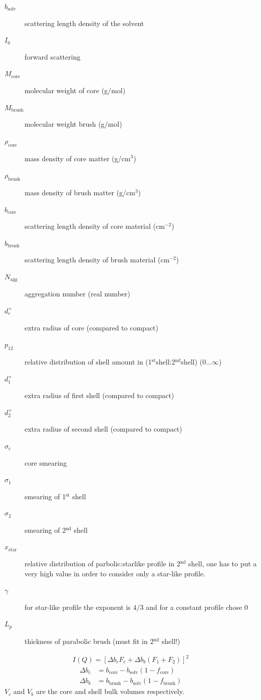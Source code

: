 \begin{description}
\item[$b_\text{solv}$]  scattering length density of the solvent
\item[$I_0$] forward scattering
\item[$M_\text{core}$] molecular weight of core (g/mol)
\item[$M_\text{brush}$] molecular weight brush (g/mol)
\item[$\rho_\text{core}$] mass density of core matter (g/cm$^3$)
\item[$\rho_\text{brush}$] mass density of brush matter (g/cm$^3$)
\item[$b_\text{core}$] scattering length density of core material (cm$^{-2}$)
\item[$b_\text{brush}$] scattering length density of brush material (cm$^{-2}$)
\item[$N_\text{agg}$] aggregation number (real number)
\item[$d_c^+$] extra radius of core (compared to compact)
\item[$p_{12}$] relative distribution of shell amount in
(1$^\text{st}$shell:2$^\text{nd}$shell) ($0\ldots\infty$)
\item[$d_1^+$] extra radius of first shell (compared to compact)
\item[$d_2^+$] extra radius of second shell (compared to compact)
\item[$\sigma_c$] core smearing
\item[$\sigma_1$] smearing of 1$^\text{st}$ shell
\item[$\sigma_2$] smearing of 2$^\text{nd}$ shell
\item[$x_\text{star}$] relative distribution of
parbolic:starlike profile in 2$^\text{nd}$ shell, one has to put a
very high value in order to consider only a star-like profile.
\item[$\gamma$] for star-like profile the exponent is $4/3$ and for a constant profile chose 0
\item[$L_p$] thickness of parabolic brush (must fit in 2$^\text{nd}$ shell!)
\end{description}
\begin{align}
I(Q) = %
\left[\Delta b_c F_c + \Delta b_b (F_1+F_2)\right]^2
\end{align}
\begin{align}
\Delta b_c &= b_\text{core} - b_\text{solv}  (1-f_\text{core}) \\
\Delta b_b &= b_\text{brush} - b_\text{solv} (1-f_\text{brush})
\end{align}
$V_c$ and $V_b$ are the core and shell bulk volumes respectively.
\\

